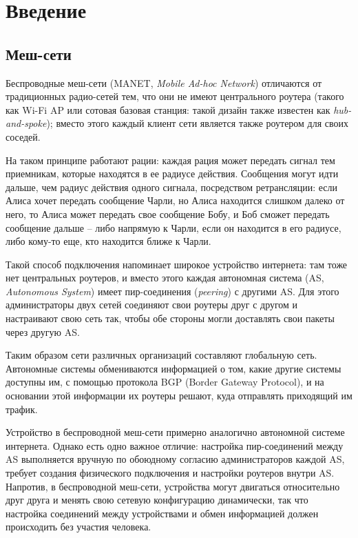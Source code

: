 \documentclass[%
]{report}
\begin{document}
\chapter{Введение}
\label{sec:intro}

\section{Меш-сети}
Беспроводные меш-сети (MANET, \emph{Mobile Ad-hoc Network})
отличаются от традиционных радио-сетей тем,
что они не имеют центрального роутера (такого как Wi-Fi AP или сотовая базовая станция: такой дизайн также известен как \emph{hub-and-spoke});
вместо этого каждый клиент сети является также роутером для своих соседей.

На таком принципе работают рации:
каждая рация может передать сигнал тем приемникам, которые находятся в ее радиусе действия.
Сообщения могут идти дальше, чем радиус действия одного сигнала,
посредством ретрансляции:
если Алиса хочет передать сообщение Чарли,
но Алиса находится слишком далеко от него,
то Алиса может передать свое сообщение Бобу,
и Боб сможет передать сообщение дальше --
либо напрямую к Чарли, если он находится в его радиусе,
либо кому-то еще, кто находится ближе к Чарли.

Такой способ подключения напоминает широкое устройство интернета:
там тоже нет центральных роутеров,
и вместо этого каждая автономная система (AS, \emph{Autonomous System})
имеет пир-соединения (\emph{peering}) с другими AS.
Для этого администраторы двух сетей
соединяют свои роутеры друг с другом
и настраивают свою сеть так, чтобы обе стороны
могли доставлять свои пакеты через другую AS.

Таким образом сети различных организаций составляют глобальную сеть.
Автономные системы обмениваются информацией о том, какие другие системы доступны им,
с помощью протокола BGP (Border Gateway Protocol),
и на основании этой информации их роутеры решают, куда отправлять приходящий им трафик.

Устройство в беспроводной меш-сети примерно аналогично автономной системе интернета.
Однако есть одно важное отличие:
настройка пир-соединений между AS выполняется вручную
по обоюдному согласию администраторов каждой AS,
требует создания физического подключения
и настройки роутеров внутри AS.
Напротив, в беспроводной меш-сети,
устройства могут двигаться относительно друг друга и менять свою сетевую конфигурацию динамически,
так что настройка соединений между устройствами и обмен информацией
должен происходить без участия человека.
\end{document}
